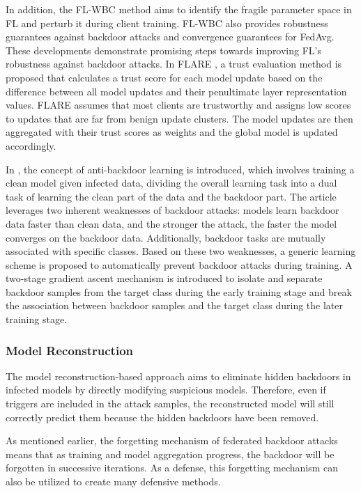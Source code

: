 \documentclass[conference]{IEEEtran}
\begin{document}
In addition, the FL-WBC \cite{b88} method aims to identify the fragile parameter space in FL and perturb it
during client training. FL-WBC also provides robustness guarantees against backdoor attacks and convergence guarantees for FedAvg.
These developments demonstrate promising steps towards improving FL's robustness against backdoor attacks. In FLARE \cite{b89}, a trust
evaluation method is proposed that calculates a trust score for each model update based on the difference between all model updates and
their penultimate layer representation values. FLARE assumes that most clients are trustworthy and assigns low scores
to updates that are far from benign update clusters. The model updates are then aggregated with their trust scores as
weights and the global model is updated accordingly.

In \cite{b98}, the concept of anti-backdoor learning is introduced, which involves training a clean model given infected data,
dividing the overall learning task into a dual task of learning the clean part of the data and the backdoor part.
The article leverages two inherent weaknesses of backdoor attacks: models learn backdoor data faster than clean data,
and the stronger the attack, the faster the model converges on the backdoor data. Additionally, backdoor tasks are mutually
associated with specific classes. Based on these two weaknesses, a generic learning scheme is proposed to automatically prevent
backdoor attacks during training. A two-stage gradient ascent mechanism is introduced to isolate and separate backdoor samples
from the target class during the early training stage and break the association between backdoor samples and the target class during the later training stage.
\subsubsection{Model Reconstruction}
The model reconstruction-based approach aims to eliminate hidden backdoors in infected models by directly modifying suspicious models.
Therefore, even if triggers are included in the attack samples, the reconstructed model will still correctly predict them because
the hidden backdoors have been removed.

As mentioned earlier, the forgetting mechanism of federated backdoor attacks means that as training and model aggregation progress,
the backdoor will be forgotten in successive iterations. As a defense, this forgetting mechanism can also be utilized to create many defensive methods.
\end{document}
